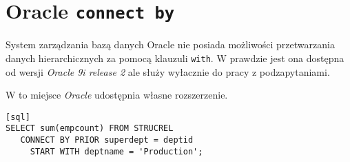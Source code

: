 \section{Oracle \texttt{connect by}}


System zarządzania bazą danych Oracle nie posiada możliwości przetwarzania danych hierarchicznych za pomocą klauzuli \texttt{with}.
W prawdzie jest ona dostępna od wersji \emph{Oracle 9i release 2} ale służy wyłacznie do pracy z podzapytaniami.

W to miejsce \emph{Oracle} udostępnia własne rozszerzenie. 

\begin{verbatim}[sql]
SELECT sum(empcount) FROM STRUCREL
   CONNECT BY PRIOR superdept = deptid
     START WITH deptname = 'Production';
\end{verbatim}
